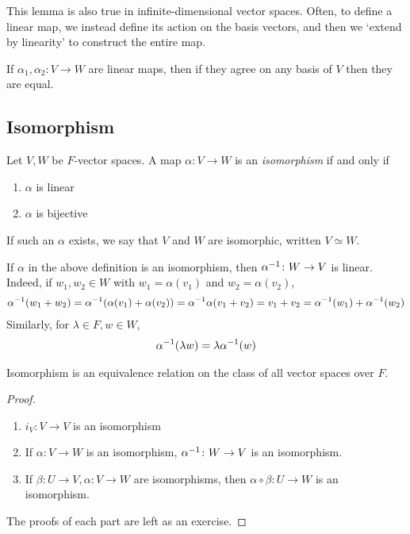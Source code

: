     \begin{remark}
        This lemma is also true in infinite-dimensional vector spaces.
        Often, to define a linear map, we instead define its action on the basis vectors, and then we `extend by linearity' to construct the entire map.
    \end{remark}
    \begin{remark}
        If $\alpha_1, \alpha_2 \colon V \to W$ are linear maps, then if they agree on any basis of $V$ then they are equal.
    \end{remark}

    \subsection{Isomorphism}
    \begin{definition}
        Let $V, W$ be $F$-vector spaces.
        A map $\alpha \colon V \to W$ is an \textit{isomorphism} if and only if
        \begin{enumerate}
            \item $\alpha$ is linear
            \item $\alpha$ is bijective
        \end{enumerate}
        If such an $\alpha$ exists, we say that $V$ and $W$ are isomorphic, written $V \simeq W$.
    \end{definition}
    \begin{remark}
        If $\alpha$ in the above definition is an isomorphism, then $\alpha^{-1} \colon W \to V$ is linear.
        Indeed, if $w_1, w_2 \in W$ with $w_1 = \alpha(v_1)$ and $w_2 = \alpha(v_2)$,
        \begin{align*}
            \alpha^{-1} (w_1 + w_2) = \alpha^{-1} (\alpha(v_1) + \alpha(v_2)) = \alpha^{-1} \alpha (v_1 + v_2) = v_1 + v_2 = \alpha^{-1}(w_1) + \alpha^{-1}(w_2)
        \end{align*}
        Similarly, for $\lambda \in F, w \in W$,
        \begin{align*}
            \alpha^{-1}(\lambda w) = \lambda \alpha^{-1}(w)
        \end{align*}
    \end{remark}
    \begin{lemma}
        Isomorphism is an equivalence relation on the class of all vector spaces over $F$.
    \end{lemma}
    \begin{proof}
        \begin{enumerate}
            \item $i_V \colon V \to V$ is an isomorphism
            \item If $\alpha \colon V \to W$ is an isomorphism, $\alpha^{-1} \colon W \to V$ is an isomorphism.
            \item If $\beta \colon U \to V, \alpha \colon V \to W$ are isomorphisms, then $\alpha \circ \beta \colon U \to W$ is an isomorphism.
        \end{enumerate}
        The proofs of each part are left as an exercise.
    \end{proof}
